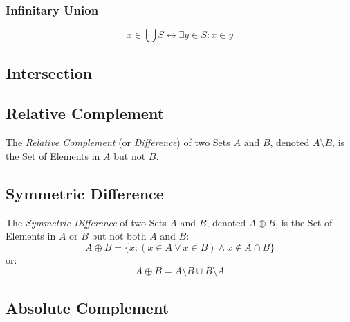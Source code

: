 \subsubsection{Infinitary Union}\label{sec:infinitary_union}

\[
  x \in \bigcup S \leftrightarrow \exists y \in S : x \in y
\]



\subsection{Intersection}\label{sec:intersection}



\subsection{Relative Complement}\label{sec:relative_complement}

The \emph{Relative Complement} (or \emph{Difference}) of two Sets $A$
and $B$, denoted $A \setminus B$, is the Set of Elements in $A$ but
not $B$.



\subsection{Symmetric Difference}\label{sec:symmetric_difference}

The \emph{Symmetric Difference} of two Sets $A$ and $B$, denoted $A
\oplus B$, is the Set of Elements in $A$ or $B$ but not both $A$ and
$B$:
\[
  A \oplus B =
  \{ x : (x \in A \vee x \in B) \wedge x \notin A \cap B \}
\]
or:
\[
  A \oplus B = A \setminus B \cup B \setminus A
\]



\subsection{Absolute Complement}\label{sec:absolute_complement}

